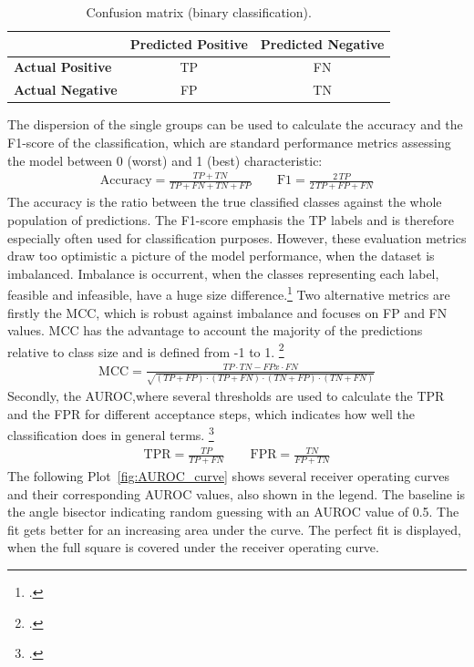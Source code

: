 \begin{table}[ht]
    \centering
    \begin{tabular}{@{}lcc@{}}
        \toprule
                                 & \textbf{Predicted Positive} & \textbf{Predicted Negative} \\
        \midrule
        \textbf{Actual Positive} & \Gls{TP}                    & \Gls{FN}                    \\
        \textbf{Actual Negative} & \Gls{FP}                    & \Gls{TN}                    \\
        \bottomrule
    \end{tabular}
    \caption{Confusion matrix (binary classification).}
    \label{tab:confusion_matrix}
\end{table}

The dispersion of the single groups can be used to calculate the accuracy and the F1-score of the classification,
which are standard performance metrics assessing the model between 0 (worst) and 1 (best) characteristic:
\begin{align}
    \text{Accuracy}=\frac{TP+TN}{TP+FN+TN+FP}
    \qquad
    \text{F1}=\frac{2\,TP}{2\,TP+FP+FN}
\end{align}
The accuracy is the ratio between the true classified classes against the whole population
of predictions. The F1-score emphasis the \gls{TP} labels and is therefore especially
often used for classification purposes.
However, these evaluation metrics draw too optimistic a picture of the model performance,
when the dataset is imbalanced. Imbalance is occurrent,
when the classes representing each label, feasible and infeasible, have a huge size difference.\footcite[cf.][p.2f.]{chicco_advantages_2020}
Two alternative metrics are firstly the \gls{MCC}, which is robust against imbalance
and focuses on \gls{FP} and \gls{FN} values. \gls{MCC} has the advantage to account the majority of the predictions
relative to class size and is defined from -1 to 1. \footcite[cf.][p.5]{chicco_advantages_2020}
\begin{align}
    \text{MCC}=\frac{TP \cdot TN - FP x\cdot FN}{\sqrt{(TP+FP)\cdot(TP+FN)\cdot(TN+FP)\cdot(TN+FN)}}
\end{align}
Secondly, the \gls{AUROC},where several thresholds are used
to calculate the \gls{TPR} and the \gls{FPR} for different acceptance steps,
which indicates how well the classification does in general terms. \footcite[cf.][p.2f.]{chicco_advantages_2020}
\begin{align}
    \text{TPR}=\frac{TP}{TP+FN}
    \qquad
    \text{FPR}=\frac{TN}{FP+TN}
\end{align}
The following Plot~\ref{fig:AUROC_curve} shows several receiver operating curves and their corresponding \gls{AUROC} values, also shown
in the legend. The baseline is the angle bisector indicating random guessing with an \gls{AUROC} value of 0.5. The fit gets better
for an increasing area under the curve. The perfect fit is displayed, when the full square is covered under the receiver operating curve.

